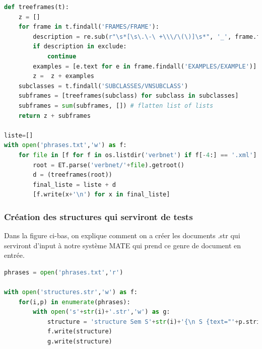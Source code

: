 \begin{lstlisting}[language=Python, caption = code pour créer phrases.txt]
def treeframes(t):
    z = []
    for frame in t.findall('FRAMES/FRAME'):
        description = re.sub(r"\s*[\s\.\-\ +\\\/\(\)]\s*", '_', frame.find('DESCRIPTION').get('primary'))
        if description in exclude:
            continue    
        examples = [e.text for e in frame.findall('EXAMPLES/EXAMPLE')]
        z =  z + examples 
    subclasses = t.findall('SUBCLASSES/VNSUBCLASS')
    subframes = [treeframes(subclass) for subclass in subclasses]
    subframes = sum(subframes, []) # flatten list of lists
    return z + subframes

liste=[]
with open('phrases.txt','w') as f:
    for file in [f for f in os.listdir('verbnet') if f[-4:] == '.xml']:
        root = ET.parse('verbnet/'+file).getroot()       
        d = (treeframes(root))
        final_liste = liste + d
        [f.write(x+'\n') for x in final_liste]

\end{lstlisting}

\subsubsection{Création des structures qui serviront de tests}

Dans la figure ci-bas, on explique comment on a créer les documents .str qui serviront d'input à notre système MATE qui prend ce genre de document en entrée.

\begin{lstlisting}[language=Python, caption = code pour créer des structures .str]
phrases = open('phrases.txt','r')

with open('structures.str','w') as f:
    for(i,p) in enumerate(phrases):
        with open('s'+str(i)+'.str','w') as g:
            structure = 'structure Sem S'+str(i)+'{\n S {text="'+p.strip()+'"\n\n main-> \n }\n}'
            f.write(structure)
            g.write(structure)
\end{lstlisting}

